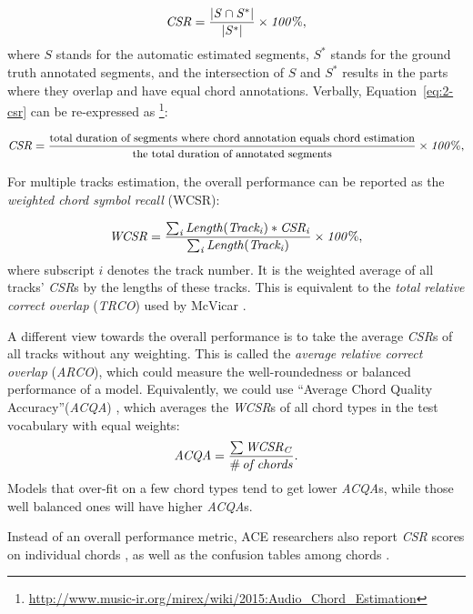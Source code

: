 \begin{equation}
\mathit{CSR = {|S\cap S^*|\over|S^*|} \times 100\%,}
\label{eq:2-csr}
\end{equation}
where $S$ stands for the automatic estimated segments, $S^*$ stands for the ground truth annotated segments, and the intersection of $S$ and $S^*$ results in the parts where they overlap and have equal chord annotations. Verbally, Equation~\ref{eq:2-csr} can be re-expressed as \footnote{\url{http://www.music-ir.org/mirex/wiki/2015:Audio\_Chord\_Estimation}}:

\begin{equation}\footnotesize
\mathit{CSR = {\text{total duration of segments where chord annotation equals chord estimation}\over\text{the total duration of annotated segments}} \times 100\%,}
\label{eq:2-csrv}
\end{equation}

For multiple tracks estimation, the overall performance can be reported as the {\it weighted chord symbol recall} (WCSR):

\begin{equation}
\mathit{WCSR = {\sum_i{Length(Track_i)*CSR_i} \over \sum_i{Length(Track_i)}}\times 100\%,}
\label{eq:2-wcsr}
\end{equation}
where subscript $i$ denotes the track number. It is the weighted average of all tracks' \textit{CSR}s by the lengths of these tracks. This is equivalent to the {\it total relative correct overlap} (\textit{TRCO}) used by McVicar \cite{mcvicar2013machine}.

A different view towards the overall performance is to take the average \textit{CSR}s of all tracks without any weighting. This is called the {\it average relative correct overlap} (\textit{ARCO}), which could measure the well-roundedness or balanced performance of a model. Equivalently, we could use ``Average Chord Quality Accuracy''(\textit{ACQA}) \cite{cho2014improved}, which averages the \textit{WCSR}s of all chord types in the test vocabulary with equal weights:
\begin{equation}
\mathit{ACQA = {{\sum{WCSR_{C}}} \over {\#\,of\,chords}}}.
\label{eq:2-acqa}
\end{equation}
Models that over-fit on a few chord types tend to get lower \textit{ACQA}s, while those well balanced ones will have higher \textit{ACQA}s.

Instead of an overall performance metric, ACE researchers also report \textit{CSR} scores on individual chords \cite{mauch2010automatic,deng2016chord}, as well as the confusion tables among chords \cite{mauch2010automatic,oudre2010template,papadopoulos2010joint,khadkevich2011music,deng2016hybrid}.

